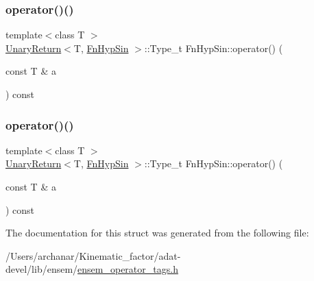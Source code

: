 \mbox{\label{structFnHypSin_adea3b5d45ae2d7b5ab84b310d4d4e339}} 
\subsubsection{\texorpdfstring{operator()()}{operator()()}\hspace{0.1cm}{\footnotesize\ttfamily [2/3]}}
{\footnotesize\ttfamily template$<$class T $>$ \\
\mbox{\hyperlink{structUnaryReturn}{Unary\+Return}}$<$T, \mbox{\hyperlink{structFnHypSin}{Fn\+Hyp\+Sin}} $>$\+::Type\+\_\+t Fn\+Hyp\+Sin\+::operator() (\begin{DoxyParamCaption}\item[{const T \&}]{a }\end{DoxyParamCaption}) const\hspace{0.3cm}{\ttfamily [inline]}}

\mbox{\label{structFnHypSin_adea3b5d45ae2d7b5ab84b310d4d4e339}} 
\subsubsection{\texorpdfstring{operator()()}{operator()()}\hspace{0.1cm}{\footnotesize\ttfamily [3/3]}}
{\footnotesize\ttfamily template$<$class T $>$ \\
\mbox{\hyperlink{structUnaryReturn}{Unary\+Return}}$<$T, \mbox{\hyperlink{structFnHypSin}{Fn\+Hyp\+Sin}} $>$\+::Type\+\_\+t Fn\+Hyp\+Sin\+::operator() (\begin{DoxyParamCaption}\item[{const T \&}]{a }\end{DoxyParamCaption}) const\hspace{0.3cm}{\ttfamily [inline]}}



The documentation for this struct was generated from the following file\+:\begin{DoxyCompactItemize}
\item 
/\+Users/archanar/\+Kinematic\+\_\+factor/adat-\/devel/lib/ensem/\mbox{\hyperlink{adat-devel_2lib_2ensem_2ensem__operator__tags_8h}{ensem\+\_\+operator\+\_\+tags.\+h}}\end{DoxyCompactItemize}
